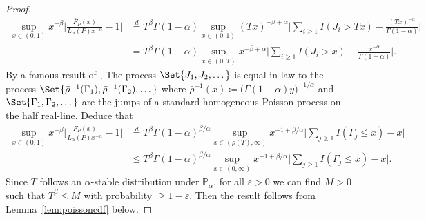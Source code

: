 \documentclass{article}
\newcommand{\1}{\boldsymbol{1}}
\newcommand{\PP}{\mathbb{P}}
\theoremstyle{plain}
\begin{document}
\begin{proof}
\begin{align*}
    \sup_{x\in (0,1)}x^{-\beta}\Big| \frac{\bar{F}_P(x)}{L_{\alpha}(P)x^{-\alpha}} -1\Big|
    &\overset{d}{=} T^{\beta} \Gamma(1-\alpha)\sup_{x\in (0,1)} (Tx)^{-\beta + \alpha}\Big|\sum_{i\geq 1}I(J_i > Tx) - \frac{(Tx)^{-\alpha}}{\Gamma(1-\alpha)}  \Big|\\
    &= T^{\beta} \Gamma(1-\alpha)\sup_{x\in (0,T)} x^{-\beta + \alpha}\Big|\sum_{i\geq 1}I(J_i > x) - \frac{x^{-\alpha}}{\Gamma(1-\alpha)}  \Big|.
  \end{align*}
  By a famous result of \cite{Fer(72)}, The process $\Set{J_1,J_2,\dots}$ is equal in law to the process $\Set{\bar{\rho}^{-1}(\Gamma_1),\bar{\rho}^{-1}(\Gamma_2),\dots}$ where $\bar{\rho}^{-1}(x) \coloneqq \big( \Gamma(1-\alpha)y \big)^{-1/\alpha}$ and $\Set{\Gamma_1,\Gamma_2,\dots}$ are the jumps of a standard homogeneous Poisson process on the half real-line. Deduce that
  \begin{align*}
    \sup_{x\in (0,1)}x^{-\beta}\Big| \frac{\bar{F}_P(x)}{L_{\alpha}(P)x^{-\alpha}} -1\Big|
    &\overset{d}{=} T^{\beta}\Gamma(1-\alpha)^{\beta/\alpha} \sup_{x\in (\bar{\rho}(T),\infty)} x^{-1 + \beta/\alpha}\Big| \sum_{j\geq 1}I(\Gamma_j \leq x) - x\Big|\\
    &\leq T^{\beta}\Gamma(1-\alpha)^{\beta/\alpha} \sup_{x\in (0,\infty)} x^{-1 + \beta/\alpha}\Big| \sum_{j\geq 1}I(\Gamma_j \leq x) - x\Big|.
  \end{align*}
  Since $T$ follows an $\alpha$-stable distribution under $\PP_{\alpha}$, for all $\varepsilon > 0$ we can find $M > 0$ such that $T^{\beta} \leq M$ with probability $\geq 1 - \varepsilon$. Then the result follows from Lemma~\ref{lem:poissoncdf} below.
 \end{proof}
\end{document}
